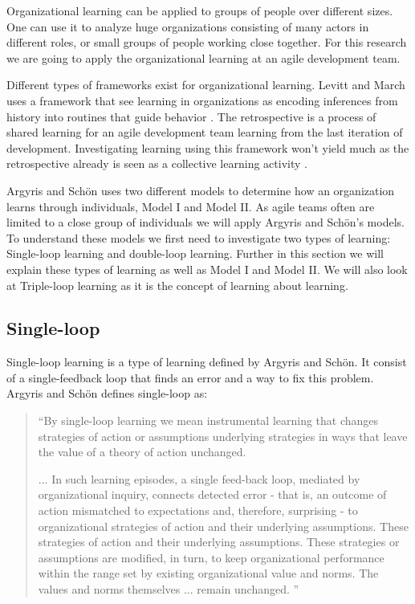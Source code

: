 Organizational learning can be applied to groups of people over different sizes. One can use it to analyze huge organizations consisting of many actors in different roles, or small groups of people working close together. For this research we are going to apply the organizational learning at an agile development team. 

Different types of frameworks exist for organizational learning. Levitt and March uses a framework that see learning in organizations as encoding inferences from history into routines that guide behavior \cite{Levitt1988}. The retrospective is a process of shared learning for an agile development team learning from the last iteration of development. Investigating learning using this framework won't yield much as the retrospective already is seen as a collective learning activity \cite{Dingsoyr2004}. 

Argyris and Schön \cite{Argyris1996} uses two different models to determine how an organization learns through individuals, Model I and Model II. As agile teams often are limited to a close group of individuals we will apply Argyris and Schön's models. To understand these models we first need to investigate two types of learning: Single-loop learning and double-loop learning. Further in this section we will explain these types of learning as well as Model I and Model II. We will also look at Triple-loop learning as it is the concept of learning about learning. 

\subsection{Single-loop}
Single-loop learning is a type of learning defined by Argyris and Schön. It consist of a single-feedback loop that finds an error and a way to fix this problem. Argyris and Schön \cite{Argyris1996} defines single-loop as: 

\begin{quote}
``By single-loop learning we mean instrumental learning that changes strategies of action or assumptions underlying strategies in ways that leave the value of a theory of action unchanged.

... In such learning episodes, a single feed-back loop, mediated by organizational inquiry, connects detected error - that is, an outcome of action mismatched to expectations and, therefore, surprising - to organizational strategies of action and their underlying assumptions. These strategies of action and their underlying assumptions. These strategies or assumptions are modified, in turn, to keep organizational performance within the range set by existing organizational value and norms. The values and norms themselves ... remain unchanged. 
''
\end{quote}

